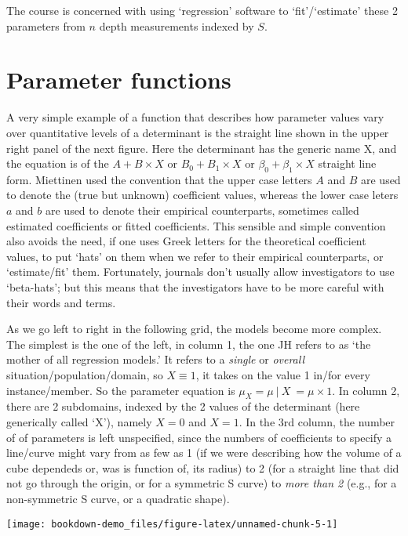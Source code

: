 \documentclass[]{book}
\begin{document}
The course is concerned with using `regression' software to `fit'/`estimate' these 2 parameters from \(n\) depth measurements indexed by \(S\).

\hypertarget{parameter-functions}{%
\section{Parameter functions}\label{parameter-functions}}

A very simple example of a function that describes how parameter values vary over quantitative levels of a determinant is the straight line shown in the upper right panel of the next figure. Here the determinant has the generic name X, and the equation is of the \(A + B \times X\) or \(B_0 + B_1 \times X\) or \(\beta_0 + \beta_1 \times X\) straight line form. Miettinen used the convention that the upper case letters \(A\) and \(B\) are used to denote the (true but unknown) coefficient values, whereas the lower case leters \(a\) and \(b\) are used to denote their empirical counterparts, sometimes called estimated coefficients or fitted coefficients. This sensible and simple convention also avoids the need, if one uses Greek letters for the theoretical coefficient values, to put `hats' on them when we refer to their empirical counterparts, or `estimate/fit' them. Fortunately, journals don't usually allow investigators to use `beta-hats'; but this means that the investigators have to be more careful with their words and terms.

As we go left to right in the following grid, the models become more complex. The simplest is the one of the left, in column 1, the one JH refers to as `the mother of all regression models.' It refers to a \emph{single} or \emph{overall} situation/population/domain, so \(X \equiv 1\), it takes on the value 1 in/for every instance/member. So the parameter equation is \(\mu_X = \mu \ | \ X \ = \mu \times 1.\) In column 2, there are 2 subdomains, indexed by the 2 values of the determinant (here generically called `X'), namely \(X = 0\) and \(X = 1\). In the 3rd column, the number of of parameters is left unspecified, since the numbers of coefficients to specify a line/curve might vary from as few as 1 (if we were describing how the volume of a cube dependeds or, was is function of, its radius) to 2 (for a straight line that did not go through the origin, or for a symmetric S curve) to \emph{more than 2} (e.g., for a non-symmetric S curve, or a quadratic shape).

\begin{center}\texttt{[image: bookdown-demo\_files/figure-latex/unnamed-chunk-5-1]} \end{center}
\end{document}
